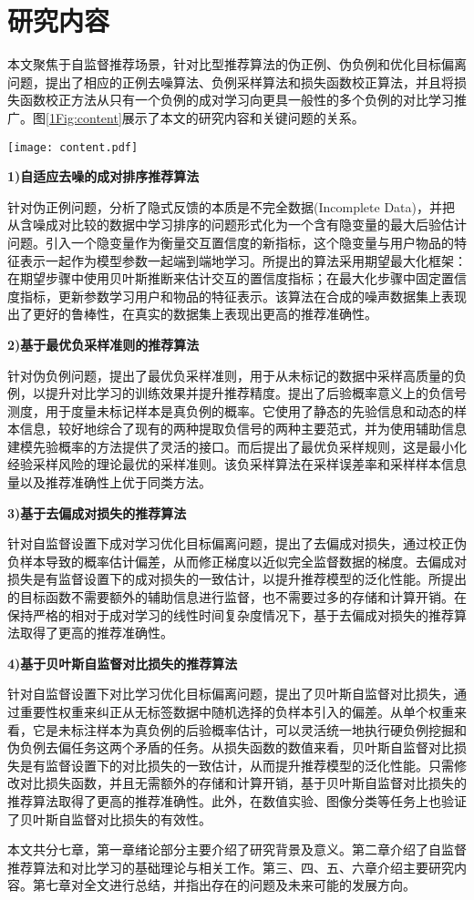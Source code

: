 \section{研究内容}
本文聚焦于自监督推荐场景，针对比型推荐算法的伪正例、伪负例和优化目标偏离问题，提出了相应的正例去噪算法、负例采样算法和损失函数校正算法，并且将损失函数校正方法从只有一个负例的成对学习向更具一般性的多个负例的对比学习推广。图\ref{1Fig:content}展示了本文的研究内容和关键问题的关系。
\begin{figure*}[!]
	\centering
	\texttt{[image: content.pdf]}
	\caption{关键问题与研究内容的关系}
	\label{1Fig:content}
\end{figure*}

\textbf{1)自适应去噪的成对排序推荐算法}


针对伪正例问题，分析了隐式反馈的本质是不完全数据(Incomplete Data)，并把从含噪成对比较的数据中学习排序的问题形式化为一个含有隐变量的最大后验估计问题。引入一个隐变量作为衡量交互置信度的新指标，这个隐变量与用户物品的特征表示一起作为模型参数一起端到端地学习。所提出的算法采用期望最大化框架：在期望步骤中使用贝叶斯推断来估计交互的置信度指标；在最大化步骤中固定置信度指标，更新参数学习用户和物品的特征表示。该算法在合成的噪声数据集上表现出了更好的鲁棒性，在真实的数据集上表现出更高的推荐准确性。


\textbf{2)基于最优负采样准则的推荐算法}


针对伪负例问题，提出了最优负采样准则，用于从未标记的数据中采样高质量的负例，以提升对比学习的训练效果并提升推荐精度。提出了后验概率意义上的负信号测度，用于度量未标记样本是真负例的概率。它使用了静态的先验信息和动态的样本信息，较好地综合了现有的两种提取负信号的两种主要范式，并为使用辅助信息建模先验概率的方法提供了灵活的接口。而后提出了最优负采样规则，这是最小化经验采样风险的理论最优的采样准则。该负采样算法在采样误差率和采样样本信息量以及推荐准确性上优于同类方法。


\textbf{3)基于去偏成对损失的推荐算法}


针对自监督设置下成对学习优化目标偏离问题，提出了去偏成对损失，通过校正伪负样本导致的概率估计偏差，从而修正梯度以近似完全监督数据的梯度。去偏成对损失是有监督设置下的成对损失的一致估计，以提升推荐模型的泛化性能。所提出的目标函数不需要额外的辅助信息进行监督，也不需要过多的存储和计算开销。在保持严格的相对于成对学习的线性时间复杂度情况下，基于去偏成对损失的推荐算法取得了更高的推荐准确性。


\textbf{4)基于贝叶斯自监督对比损失的推荐算法}


针对自监督设置下对比学习优化目标偏离问题，提出了贝叶斯自监督对比损失，通过重要性权重来纠正从无标签数据中随机选择的负样本引入的偏差。从单个权重来看，它是未标注样本为真负例的后验概率估计，可以灵活统一地执行硬负例挖掘和伪负例去偏任务这两个矛盾的任务。从损失函数的数值来看，贝叶斯自监督对比损失是有监督设置下的对比损失的一致估计，从而提升推荐模型的泛化性能。只需修改对比损失函数，并且无需额外的存储和计算开销，基于贝叶斯自监督对比损失的推荐算法取得了更高的推荐准确性。此外，在数值实验、图像分类等任务上也验证了贝叶斯自监督对比损失的有效性。

本文共分七章，第一章绪论部分主要介绍了研究背景及意义。第二章介绍了自监督推荐算法和对比学习的基础理论与相关工作。第三、四、五、六章介绍主要研究内容。第七章对全文进行总结，并指出存在的问题及未来可能的发展方向。




